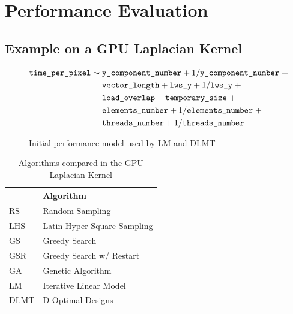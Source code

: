 \documentclass[conference]{IEEEtran}
\begin{document}
\section{Performance Evaluation}
\label{sec:org94a595e}
\subsection{Example on a GPU Laplacian Kernel}
\label{sec:org3eed071}
\begin{figure}
{\scriptsize
\begin{align*}
\texttt{time\_per\_pixel} \thicksim & \; \texttt{y\_component\_number} + 1 / \texttt{y\_component\_number} \; + \\
& \; \texttt{vector\_length} + \texttt{lws\_y} + 1 / \texttt{lws\_y} \; + \\
& \; \texttt{load\_overlap} + \texttt{temporary\_size} \; + \\
& \; \texttt{elements\_number} + 1 / \texttt{elements\_number} \; + \\
& \; \texttt{threads\_number} + 1 /\texttt{threads\_number}
\end{align*}
}
\caption{Initial performance model used by LM and DLMT}
\end{figure}

\begin{table}[ht]
\caption{Algorithms compared in the GPU Laplacian Kernel}
\centering
\footnotesize
\begin{tabular}{ll}
\toprule
 & Algorithm\\
\midrule
RS & Random Sampling\\
LHS & Latin Hyper Square Sampling\\
GS & Greedy Search\\
GSR & Greedy Search w/ Restart\\
GA & Genetic Algorithm\\
LM & Iterative Linear Model\\
DLMT & D-Optimal Designs\\
\bottomrule
\end{tabular}
\end{table}
\end{document}

